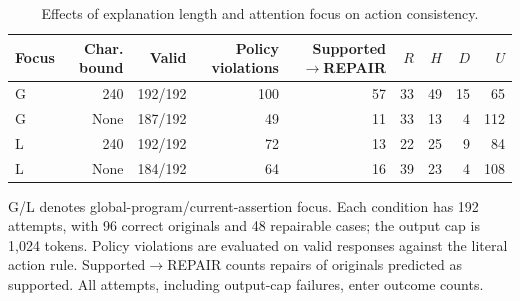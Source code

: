 \begin{table}[t]
\centering
\small
\caption{Effects of explanation length and attention focus on action consistency.}
\label{tab:reason_limit}
\begin{tabular}{lrrrrrrrr}
\toprule
Focus & Char. bound & Valid & Policy violations & Supported$\to$REPAIR & $R$ & $H$ & $D$ & $U$ \\
\midrule
G & 240 & 192/192 & 100 & 57 & 33 & 49 & 15 & 65 \\
G & None & 187/192 & 49 & 11 & 33 & 13 & 4 & 112 \\
L & 240 & 192/192 & 72 & 13 & 22 & 25 & 9 & 84 \\
L & None & 184/192 & 64 & 16 & 39 & 23 & 4 & 108 \\
\bottomrule
\end{tabular}
\par\smallskip
\begin{minipage}{\linewidth}
\footnotesize
G/L denotes global-program/current-assertion focus. Each condition has 192 attempts, with 96 correct originals and 48 repairable cases; the output cap is 1,024 tokens. Policy violations are evaluated on valid responses against the literal action rule. Supported$\to$REPAIR counts repairs of originals predicted as supported. All attempts, including output-cap failures, enter outcome counts.
\end{minipage}
\end{table}
